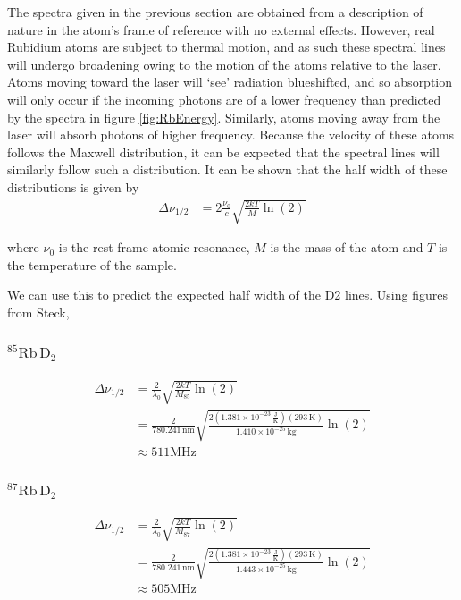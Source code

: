 \documentclass[12pt]{article}
\begin{document}
The spectra given in the previous section are obtained from a description of nature in the atom's frame of reference with no external effects.  However, real Rubidium atoms are subject to thermal motion, and as such these spectral lines will undergo broadening owing to the motion of the atoms relative to the laser.  Atoms moving toward the laser will `see' radiation blueshifted, and so absorption will only occur if the incoming photons are of a lower frequency than predicted by the spectra in figure \ref{fig:RbEnergy}.  Similarly, atoms moving away from the laser will absorb photons of higher frequency.  Because the velocity of these atoms follows the Maxwell distribution, it can be expected that the spectral lines will similarly follow such a distribution.  It can be shown that the half width of these distributions is given by 
\begin{align}
	\Delta \nu_{1/2} &= 2\frac{\nu_0}{c}\sqrt{\frac{2kT}{M}\ln(2)}
\end{align}

where $\nu_0$ is the rest frame atomic resonance, $M$ is the mass of the atom and $T$ is the temperature of the sample.

We can use this to predict the expected half width of the D2 lines.  Using figures from Steck\cite{steck85Rb}\cite{steck87Rb},

\subsubsection*{${}^{85}\text{Rb}\,\text{D}_2$}

\begin{align*}
	\Delta \nu_{1/2} &= \frac{2}{\lambda_0}\sqrt{\frac{2kT}{M_{85}}\ln(2)}\\
	&= \frac{2}{780.241\,\text{nm}}\sqrt{\frac{2\left(1.381\times10^{-23}\,\frac{\text{J}}{\text{K}}\right)\left(293\,\text{K}\right)}{1.410\times10^{-25}\,\text{kg}}\ln(2)}\\
	&\approx 511 \text{MHz}
\end{align*}

\subsubsection*{${}^{87}\text{Rb}\,\text{D}_2$}

\begin{align*}
\Delta \nu_{1/2} &= \frac{2}{\lambda_0}\sqrt{\frac{2kT}{M_{87}}\ln(2)}\\
&= \frac{2}{780.241\,\text{nm}}\sqrt{\frac{2\left(1.381\times10^{-23}\,\frac{\text{J}}{\text{K}}\right)\left(293\,\text{K}\right)}{1.443\times10^{-25}\,\text{kg}}\ln(2)}\\
&\approx 505 \text{MHz}
\end{align*}
\end{document}
